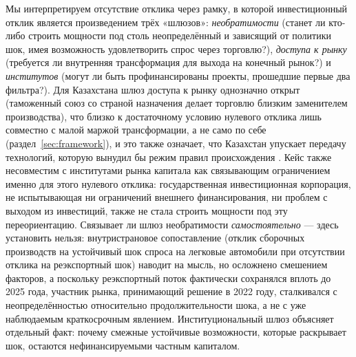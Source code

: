 \documentclass[12pt]{article}
\begin{document}
Мы интерпретируем отсутствие отклика через рамку, в которой инвестиционный отклик является
произведением трёх «шлюзов»: \emph{необратимости} (станет ли кто-либо строить мощности под
столь неопределённый и зависящий от политики шок, имея возможность удовлетворить спрос
через торговлю?), \emph{доступа к рынку} (требуется ли внутренняя трансформация для выхода
на конечный рынок?) и \emph{институтов} (могут ли быть профинансированы проекты, прошедшие
первые два фильтра?). Для Казахстана шлюз доступа к рынку однозначно открыт (таможенный
союз со страной назначения делает торговлю близким заменителем производства), что близко к
достаточному условию нулевого отклика лишь совместно с малой маржой трансформации, а не
само по себе (раздел~\ref{sec:framework}), и это также означает, что Казахстан упускает
передачу технологий, которую вынудил бы режим правил происхождения
\citep{desouza2024diffusion}. Кейс также несовместим с институтами рынка капитала как
связывающим ограничением именно для этого нулевого отклика: государственная инвестиционная
корпорация, не испытывающая ни ограничений внешнего финансирования, ни проблем с выходом из
инвестиций, также не стала строить мощности под эту переориентацию. Связывает ли шлюз
необратимости \emph{самостоятельно} — здесь установить нельзя: внутристрановое сопоставление
(отклик сборочных производств на устойчивый шок спроса на легковые автомобили при
отсутствии отклика на реэкспортный шок) наводит на мысль, но осложнено смешением факторов, а
поскольку реэкспортный поток фактически сохранялся вплоть до 2025 года, участник рынка,
принимающий решение в 2022 году, сталкивался с неопределённостью относительно
продолжительности шока, а не с уже наблюдаемым краткосрочным явлением. Институциональный
шлюз объясняет отдельный факт: почему смежные устойчивые возможности, которые раскрывает
шок, остаются нефинансируемыми частным капиталом.
\end{document}
